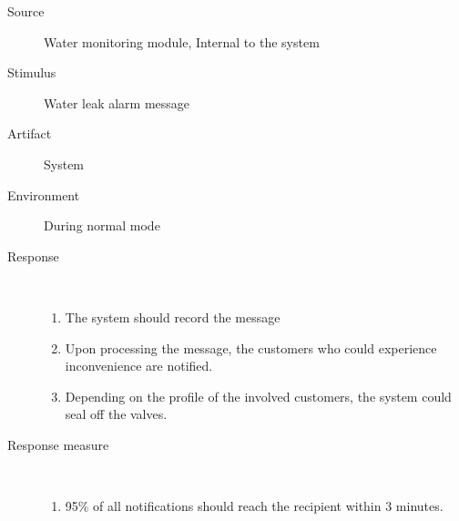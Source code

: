 \begin{description}
	\item[Source] Water monitoring module, Internal to the system
	\item[Stimulus] Water leak alarm message
	\item[Artifact] System
	\item[Environment] During normal mode
	\item[Response] \
		\begin{enumerate}
		  \item The system should record the message
		  \item Upon processing the message, the customers who could experience
		  inconvenience are notified.
		  \item Depending on the profile of the involved customers, the system
		  could seal off the valves.
		\end{enumerate}
	\item[Response measure] \
	\begin{enumerate}
	  \item 95\% of all notifications should reach the recipient within 3 minutes.
	\end{enumerate} 
\end{description}